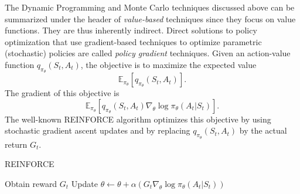 The Dynamic Programming and Monte Carlo techniques discussed above can be summarized under the header of \emph{value-based} techniques since they focus on value functions. They are thus inherently indirect. Direct solutions to policy optimization that use gradient-based techniques to optimize parametric (stochastic) policies are called \emph{policy gradient} techniques. Given an action-value function $q_{\pi_\theta}(S_t,A_t)$, the objective is to maximize the expected value  \[\mathbb{E}_{\pi_{\theta}}[q_{\pi_\theta}(S_t,A_t)].\]
The gradient of this objective is  
\[\mathbb{E}_{\pi_{\theta}}[q_{\pi_\theta}(S_t,A_t) \nabla_{\theta} \log \pi_{\theta}(A_t|S_t)].\]
The well-known REINFORCE algorithm optimizes this objective by using stochastic gradient ascent updates and by replacing $q_{\pi_\theta}(S_t,A_t)$ by the actual return $G_t$.

\begin{algorithm}[t!]
\label{algo:reinforce}
   \caption{REINFORCE}
\begin{algorithmic}[1]
\STATE Obtain reward $G_t$%
\STATE Update $\theta \leftarrow \theta + \alpha (
G_t
\nabla_{\theta} \log \pi_{\theta}(A_t|S_t))$
\ENDFOR
	\ENDFOR
\end{algorithmic}
\end{algorithm}

